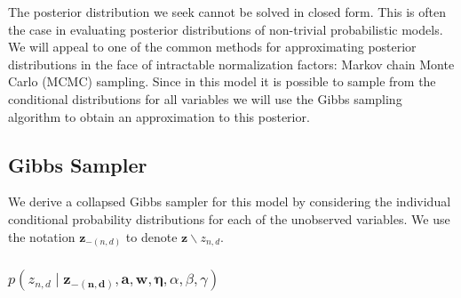 \documentclass{article}
\begin{document}
The posterior distribution we seek cannot be solved in closed form.
This is often the case in evaluating posterior distributions of non-trivial
probabilistic models. We will appeal to one of the common methods
for approximating posterior distributions in the face of intractable
normalization factors: Markov chain Monte Carlo (MCMC) sampling. Since
in this model it is possible to sample from the conditional distributions
for all variables we will use the Gibbs sampling algorithm to obtain
an approximation to this posterior. %



\subsection{Gibbs Sampler}

We derive a collapsed Gibbs sampler for this model by considering
the individual conditional probability distributions for each of the
unobserved variables. We use the notation $\mathbf{z}_{-(n,d)}$ to
denote $\mathbf{z}\backslash z_{n,d}$. %



\subsubsection{$p\left(z_{n,d}\mid\mathbf{z_{-\left(n,d\right)}},\mathbf{a},\mathbf{w},\mathbf{\eta},\alpha,\beta,\gamma\right)$}
\end{document}
